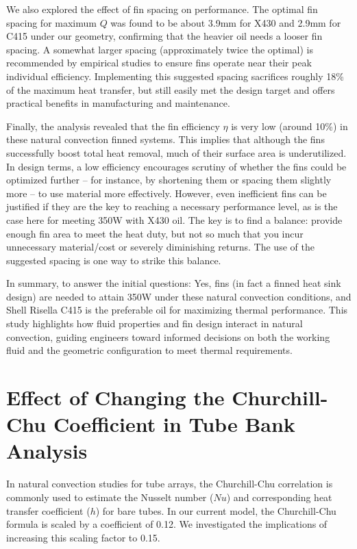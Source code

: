 \documentclass[12pt]{article}
\begin{document}
We also explored the effect of fin spacing on performance. The optimal fin spacing for maximum $Q$ was found to be about 3.9mm for X430 and 2.9mm for C415 under our geometry, confirming that the heavier oil needs a looser fin spacing. A somewhat larger spacing (approximately twice the optimal) is recommended by empirical studies to ensure fins operate near their peak individual efficiency. Implementing this suggested spacing sacrifices roughly 18\% of the maximum heat transfer, but still easily met the design target and offers practical benefits in manufacturing and maintenance.

Finally, the analysis revealed that the fin efficiency $\eta$ is very low (around 10\%) in these natural convection finned systems. This implies that although the fins successfully boost total heat removal, much of their surface area is underutilized. In design terms, a low efficiency encourages scrutiny of whether the fins could be optimized further – for instance, by shortening them or spacing them slightly more – to use material more effectively. However, even inefficient fins can be justified if they are the key to reaching a necessary performance level, as is the case here for meeting 350W with X430 oil. The key is to find a balance: provide enough fin area to meet the heat duty, but not so much that you incur unnecessary material/cost or severely diminishing returns. The use of the suggested spacing is one way to strike this balance.

In summary, to answer the initial questions: Yes, fins (in fact a finned heat sink design) are needed to attain 350W under these natural convection conditions, and Shell Risella C415 is the preferable oil for maximizing thermal performance. This study highlights how fluid properties and fin design interact in natural convection, guiding engineers toward informed decisions on both the working fluid and the geometric configuration to meet thermal requirements.


\appendix
\section{Effect of Changing the Churchill-Chu Coefficient in Tube Bank Analysis}

In natural convection studies for tube arrays, the Churchill-Chu correlation is commonly used to estimate the Nusselt number ($Nu$) and corresponding heat transfer coefficient ($h$) for bare tubes. In our current model, the Churchill-Chu formula is scaled by a coefficient of 0.12. We investigated the implications of increasing this scaling factor to 0.15.
\end{document}
